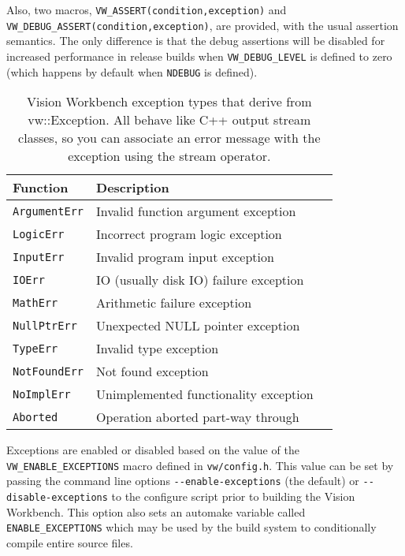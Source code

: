 Also, two macros, \verb#VW_ASSERT(condition,exception)# and
\verb#VW_DEBUG_ASSERT(condition,exception)#, are provided, with the
usual assertion semantics.  The only difference is that the debug
assertions will be disabled for increased performance in release
builds when \verb#VW_DEBUG_LEVEL# is defined to zero (which happens by
default when \verb#NDEBUG# is defined).

\begin{table}[t]\begin{centering}
\begin{tabular}{|l|l|l|} \hline
Function & Description \\ \hline \hline
\verb#ArgumentErr# & Invalid function argument exception \\ \hline
\verb#LogicErr# & Incorrect program logic exception \\ \hline
\verb#InputErr# & Invalid program input exception \\ \hline
\verb#IOErr# & IO (usually disk IO) failure exception \\ \hline
\verb#MathErr# & Arithmetic failure exception \\ \hline
\verb#NullPtrErr# & Unexpected NULL pointer exception\\ \hline
\verb#TypeErr# & Invalid type exception \\ \hline
\verb#NotFoundErr# & Not found exception \\ \hline
\verb#NoImplErr# & Unimplemented functionality exception \\ \hline
\verb#Aborted# & Operation aborted part-way through \\ \hline

\end{tabular}
\caption{Vision Workbench exception types that derive from
  vw::Exception.  All behave like C++ output stream classes, so you
  can associate an error message with the exception using the
  stream operator.}
\label{tbl:exception-types}
\end{centering}\end{table}

Exceptions are enabled or disabled based on the value of the
\verb#VW_ENABLE_EXCEPTIONS# macro defined in \verb#vw/config.h#.  This
value can be set by passing the command line options
\verb#--enable-exceptions# (the default) or \verb#--disable-exceptions#
to the configure script prior to building the Vision Workbench.  This
option also sets an automake variable called \verb#ENABLE_EXCEPTIONS#
which may be used by the build system to conditionally compile entire
source files.

